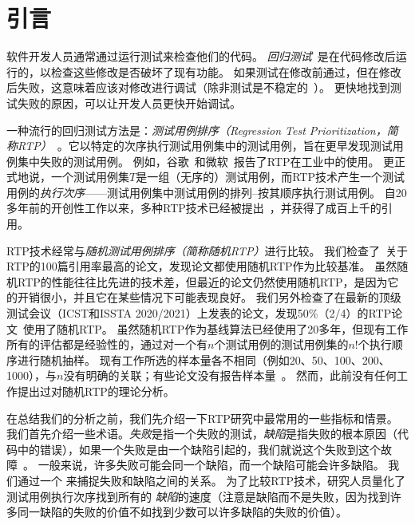 \chapter{引言}\label{sec:introduction}

软件开发人员通常通过运行测试来检查他们的代码。
\emph{回归测试}~\cite{Yoo2012H}是在代码修改后运行的，以检查这些修改是否破坏了现有功能。
如果测试在修改前通过，但在修改后失败，这意味着应该对修改进行调试（除非测试是不稳定的~\cite{LuoHEM2014}）。
更快地找到测试失败的原因，可以让开发人员更快开始调试。

一种流行的回归测试方法是：\emph{测试用例排序（Regression Test Prioritization，简称RTP）}~\cite{Elbaum2000MR,Jiang2009ZCT,rothermel2001prioritizing,kim2002history,Rummel2005KT,Yoo2012H,Liang2018RedefTCP}。它以特定的次序执行测试用例集中的测试用例，旨在更早发现测试用例集中失败的测试用例。
例如，谷歌~\cite{elbaum2014techniques}和微软~\cite{Srivastava2002T}报告了RTP在工业中的使用。
更正式地说，一个测试用例集$T$是一组（无序的）测试用例，而RTP技术产生一个测试用例的\emph{执行次序}——测试用例集中测试用例的排列--按其顺序执行测试用例。
自20多年前的开创性工作以来，多种RTP技术已经被提出~\cite{Wong1997TCP, Rothermel1999TCP, Elbaum2000MR, rothermel2001prioritizing}，并获得了成百上千的引用。

RTP技术经常与\emph{随机测试用例排序（简称随机RTP）}进行比较。
我们检查了~\cite{RTPTheoryWebsite}关于RTP的100篇引用率最高的论文，发现\litReviewCompareYes{}论文都使用随机RTP作为比较基准。
虽然随机RTP的性能往往比先进的技术差，但最近的论文仍然使用随机RTP，是因为它的开销很小，并且它在某些情况下可能表现良好。
我们另外检查了在最新的顶级测试会议（ICST和ISSTA 2020/2021）上发表的论文，发现50\%（2/4）的RTP论文~\cite{Cheng2021ZMX,Elsner2021HPR,Mondal2021N,Peng2020IRTCP}使用了随机RTP。
虽然随机RTP作为基线算法已经使用了20多年，但现有工作所有的评估都是经验性的，通过对一个有$n$个测试用例的测试用例集的$n!$个执行顺序进行随机抽样。
现有工作所选的样本量各不相同（例如20、50、100、200、1000），与$n$没有明确的关联；有些论文没有报告样本量~\cite{RTPTheoryWebsite}。
然而，此前没有任何工作提出过对随机RTP的理论分析。

在总结我们的分析之前，我们先介绍一下RTP研究中最常用的一些指标和情景。
我们首先介绍一些术语。\emph{失败}是指一个失败的测试，\emph{缺陷}是指失败的根本原因（代码中的错误），如果一个失败是由一个缺陷引起的，我们就说这个失败\emph{\detects}到这个故障~\cite{Rothermel1999TCP}。
一般来说，许多失败可能会\detect{}同一个缺陷，而一个缺陷可能会\detect{}许多缺陷。
我们通过一个 \emph{\mappingMatrix}来捕捉失败和缺陷之间的关系。
为了比较RTP技术，研究人员量化了测试用例执行次序找到所有的 \emph{缺陷}的速度（注意是缺陷而不是失败，因为找到许多\detect{}同一缺陷的失败的价值不如找到少数可以\detect{}许多缺陷的失败的价值）。

